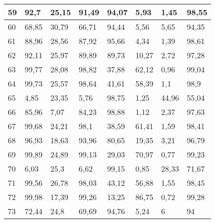 \begin{longtable}[c]{|l|l|l|l|l|l|l|l|}
59              & 92,7         & 25,15        & 91,49       & 94,07         & 5,93          & 1,45          & 98,55         \\ \hline
60              & 68,85        & 30,79        & 66,71       & 94,44         & 5,56          & 5,65          & 94,35         \\ \hline
61              & 88,96        & 28,56        & 87,92       & 95,66         & 4,34          & 1,39          & 98,61         \\ \hline
62              & 92,11        & 25,97        & 89,89       & 89,73         & 10,27         & 2,72          & 97,28         \\ \hline
63              & 99,77        & 28,08        & 98,82       & 37,88         & 62,12         & 0,96          & 99,04         \\ \hline
64              & 99,73        & 25,57        & 98,64       & 41,61         & 58,39         & 1,1           & 98,9          \\ \hline
65              & 4,85         & 23,35        & 5,76        & 98,75         & 1,25          & 44,96         & 55,04         \\ \hline
66              & 85,96        & 7,07         & 84,23       & 98,88         & 1,12          & 2,37          & 97,63         \\ \hline
67              & 99,68        & 24,21        & 98,1        & 38,59         & 61,41         & 1,59          & 98,41         \\ \hline
68              & 96,93        & 18,63        & 93,96       & 80,65         & 19,35         & 3,21          & 96,79         \\ \hline
69              & 99,89        & 24,89        & 99,13       & 29,03         & 70,97         & 0,77          & 99,23         \\ \hline
70              & 6,03         & 25,3         & 6,62        & 99,15         & 0,85          & 28,33         & 71,67         \\ \hline
71              & 99,56        & 26,78        & 98,03       & 43,12         & 56,88         & 1,55          & 98,45         \\ \hline
72              & 99,98        & 17,39        & 99,26       & 13,25         & 86,75         & 0,72          & 99,28         \\ \hline
73              & 72,44        & 24,8         & 69,69       & 94,76         & 5,24          & 6             & 94            \\ \hline

\end{longtable}
